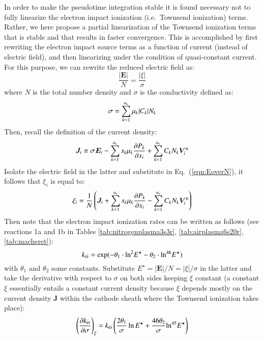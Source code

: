 \documentclass{warpdoc}
\renewcommand{\vec}[1]{\bm{#1}}
\newcommand{\ns}{{{n}_{\rm s}}}
\newcommand{\mfd}{\displaystyle}
\begin{document}
In order to make the pseudotime integration stable it is found necessary not to fully linearize the electron impact ionization (i.e.\ Townsend ionization) terms. Rather, we here propose a partial linearization of the Townsend ionization terms that is stable and that results in faster convergence. This is accomplished by first rewriting the electron impact source terms as a function of current (instead of electric field), and then linearizing under the condition of quasi-constant current. For this purpose, we can rewrite the reduced electric field as:
%
\begin{equation}
\frac{|\vec{E}|}{N}=\frac{|\xi|}{\sigma} 
\label{eqn:EoverN}
\end{equation}
%
where $N$ is the total number density and $\sigma$ is the conductivity defined as:
%
\begin{equation}
\sigma = \sum_{k=1}^\ns \mu_k |C_k| N_k
\label{eqn:sigma}
\end{equation}
%
Then, recall the definition of the current density:
%
\begin{equation}
\mfd  \vec{J}_i \equiv   \sigma \vec{E}_i 
             -  \sum_{k=1}^\ns s_k \mu_k  \frac{\partial P_k}{\partial x_i}
+ \sum_{k=1}^\ns C_k N_k \vec{V}_i^{\rm n} 
\label{eqn:J}
\end{equation}
%
Isolate the electric field in the latter and substitute in Eq.\ (\ref{eqn:EoverN}), it follows that $\xi_i$ is equal to:
%
\begin{equation}
\xi_i=\frac{1}{N}\left(\vec{J}_i+\sum_{k=1}^\ns s_k \mu_k  \frac{\partial P_k}{\partial x_i}
- \sum_{k=1}^\ns C_k N_k \vec{V}_i^{\rm n}\right)
\end{equation}
%
Then note that the electron impact ionization rates can be written as follows (see reactions 1a and 1b in Tables \ref{tab:nitrogenplasma3s3r}, \ref{tab:airplasma6s20r}, \ref{tab:macheret}):
%
\begin{equation}
k_{\rm ei}={\rm exp}(-\theta_1 \cdot {\rm ln}^2 E^\star -\theta_2 \cdot {\rm ln}^{46}E^\star)
\label{eqn:ktownsend}
\end{equation}
%
with $\theta_1$ and $\theta_2$ some constants. Substitute $E^\star=|\vec{E}|/N=|\xi|/\sigma$ in the latter and take the derivative with respect to $\sigma$ on both sides keeping $\xi$ constant (a constant $\xi$ essentially entails a constant current density because $\xi$ depends mostly on the current density $\vec{J}$ within the cathode sheath where the Townsend ionization takes place):
%
\begin{equation}
\left(\frac{\partial k_{\rm ei}}{\partial \sigma}\right)_\xi=k_{\rm ei} \left(\frac{2\theta_1}{\sigma}\ln E^\star + \frac{46 \theta_2}{\sigma} {\rm ln}^{45}E^\star \right)
\end{equation}
\end{document}
